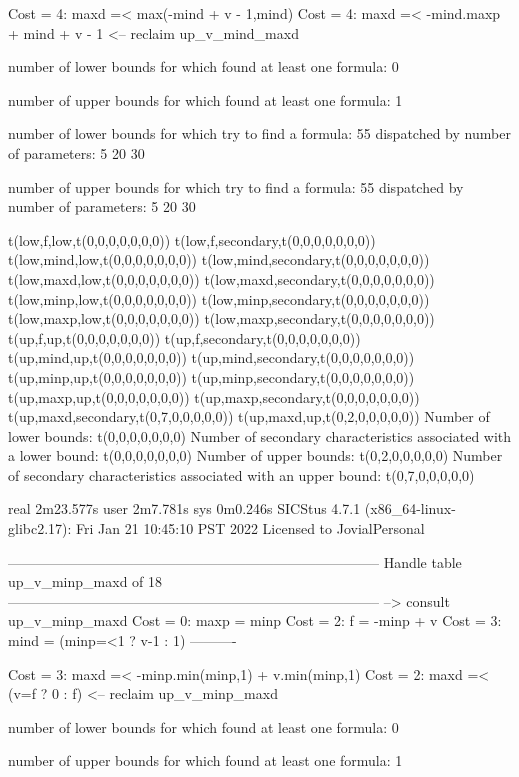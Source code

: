 Cost =  4:  maxd =< max(-mind + v - 1,mind)
Cost =  4:  maxd =< -mind.maxp + mind + v - 1
<-- reclaim up_v_mind_maxd

number of lower bounds for which found at least one formula: 0

number of upper bounds for which found at least one formula: 1

number of lower bounds for which try to find a formula: 55
dispatched by number of parameters: 5  20  30

number of upper bounds for which try to find a formula: 55
dispatched by number of parameters: 5  20  30

t(low,f,low,t(0,0,0,0,0,0,0))
t(low,f,secondary,t(0,0,0,0,0,0,0))
t(low,mind,low,t(0,0,0,0,0,0,0))
t(low,mind,secondary,t(0,0,0,0,0,0,0))
t(low,maxd,low,t(0,0,0,0,0,0,0))
t(low,maxd,secondary,t(0,0,0,0,0,0,0))
t(low,minp,low,t(0,0,0,0,0,0,0))
t(low,minp,secondary,t(0,0,0,0,0,0,0))
t(low,maxp,low,t(0,0,0,0,0,0,0))
t(low,maxp,secondary,t(0,0,0,0,0,0,0))
t(up,f,up,t(0,0,0,0,0,0,0))
t(up,f,secondary,t(0,0,0,0,0,0,0))
t(up,mind,up,t(0,0,0,0,0,0,0))
t(up,mind,secondary,t(0,0,0,0,0,0,0))
t(up,minp,up,t(0,0,0,0,0,0,0))
t(up,minp,secondary,t(0,0,0,0,0,0,0))
t(up,maxp,up,t(0,0,0,0,0,0,0))
t(up,maxp,secondary,t(0,0,0,0,0,0,0))
t(up,maxd,secondary,t(0,7,0,0,0,0,0))
t(up,maxd,up,t(0,2,0,0,0,0,0))
Number of lower bounds:                                             t(0,0,0,0,0,0,0)
Number of secondary characteristics associated with a lower bound:  t(0,0,0,0,0,0,0)
Number of upper bounds:                                             t(0,2,0,0,0,0,0)
Number of secondary characteristics associated with an upper bound: t(0,7,0,0,0,0,0)

real	2m23.577s
user	2m7.781s
sys	0m0.246s
SICStus 4.7.1 (x86_64-linux-glibc2.17): Fri Jan 21 10:45:10 PST 2022
Licensed to JovialPersonal


--------------------------------------------------------------------------------
Handle table up_v_minp_maxd of 18
--------------------------------------------------------------------------------
--> consult up_v_minp_maxd
Cost =  0:  maxp = minp
Cost =  2:  f    = -minp + v
Cost =  3:  mind = (minp=<1 ? v-1 : 1)
----------

Cost =  3:  maxd =< -minp.min(minp,1) + v.min(minp,1)
Cost =  2:  maxd =< (v=f ? 0 : f)
<-- reclaim up_v_minp_maxd

number of lower bounds for which found at least one formula: 0

number of upper bounds for which found at least one formula: 1

